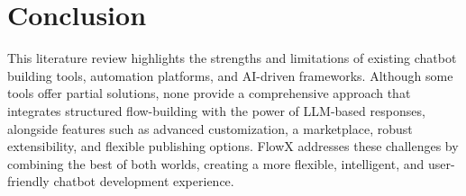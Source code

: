 \section{Conclusion}
This literature review highlights the strengths and limitations of existing chatbot building tools, automation platforms, and AI-driven frameworks. Although some tools offer partial solutions, none provide a comprehensive approach that integrates structured flow-building with the power of LLM-based responses, alongside features such as advanced customization, a marketplace, robust extensibility, and flexible publishing options. FlowX addresses these challenges by combining the best of both worlds, creating a more flexible, intelligent, and user-friendly chatbot development experience.